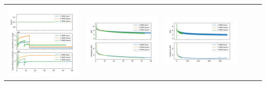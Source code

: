 \begin{longtable}[]{@{}llllll@{}}
\includegraphics{l_memory.png} & \includegraphics{l_frac.png} &
\includegraphics{l_frac_full.png}\tabularnewline

\end{longtable}
